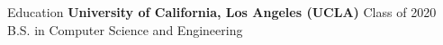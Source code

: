 \documentclass{comran_morshed_resume}
\begin{document}

\begin{rSection}{Education}
    {\bf University of California, Los Angeles (UCLA)} \hfill {Class of 2020} \\
    B.S. in Computer Science and Engineering
\end{rSection}

\end{document}
